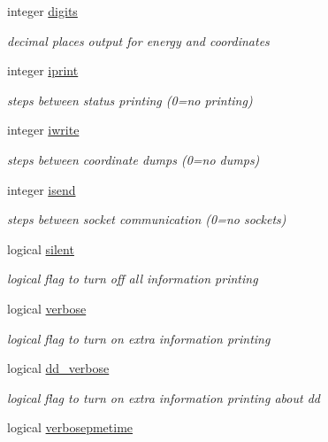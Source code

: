 \begin{DoxyCompactItemize}
\item 
integer \hyperlink{classinform_aaae7c125e88d55b253fcc1e2dc739afa}{digits}
\begin{DoxyCompactList}\small\item\em decimal places output for energy and coordinates \end{DoxyCompactList}\item 
integer \hyperlink{classinform_a1b1e50686de5b348cbbaa1894c4e9845}{iprint}
\begin{DoxyCompactList}\small\item\em steps between status printing (0=no printing) \end{DoxyCompactList}\item 
integer \hyperlink{classinform_a4ffbb5750ff45ca31a35320cbe0d8ff6}{iwrite}
\begin{DoxyCompactList}\small\item\em steps between coordinate dumps (0=no dumps) \end{DoxyCompactList}\item 
integer \hyperlink{classinform_a7002c7078c40e14db755e7c251e77ef2}{isend}
\begin{DoxyCompactList}\small\item\em steps between socket communication (0=no sockets) \end{DoxyCompactList}\item 
logical \hyperlink{classinform_a74292c5447b930476798d480fb1f1755}{silent}
\begin{DoxyCompactList}\small\item\em logical flag to turn off all information printing \end{DoxyCompactList}\item 
logical \hyperlink{classinform_abf72f950558f41a53ede4b76c1db5960}{verbose}
\begin{DoxyCompactList}\small\item\em logical flag to turn on extra information printing \end{DoxyCompactList}\item 
logical \hyperlink{classinform_ab86017b6d4b5987b1b765e0a4d9a8621}{dd\-\_\-verbose}
\begin{DoxyCompactList}\small\item\em logical flag to turn on extra information printing about dd \end{DoxyCompactList}\item 
logical \hyperlink{classinform_aa4cad958901d1f0f5df25f60424ca0d2}{verbosepmetime}

\end{DoxyCompactItemize}
